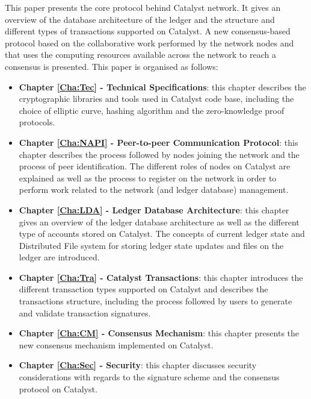 This paper presents the core protocol behind Catalyst network. It gives an overview of the database architecture of the ledger and the structure and different types of transactions supported on Catalyst. A new consensus-based protocol based on the collaborative work performed by the network nodes and that uses the computing resources available across the network to reach a consensus is presented. This paper is organised as follows:

\begin{itemize}
\item \textbf{Chapter \ref{Cha:Tec} - Technical Specifications}: this chapter describes the cryptographic libraries and tools used in Catalyst code base, including the choice of elliptic curve, hashing algorithm and the zero-knowledge proof protocols. 

\item \textbf{Chapter \ref{Cha:NAPI} - Peer-to-peer Communication Protocol}: this chapter describes the process followed by nodes joining the network and the process of peer identification. The different roles of nodes on Catalyst are explained as well as the process to register on the network in order to perform work related to the network (and ledger database) management. 

\item \textbf{Chapter \ref{Cha:LDA} - Ledger Database Architecture}: this chapter gives an overview of the ledger database architecture as well as the different type of accounts stored on Catalyst. The concepts of current ledger state and Distributed File system for storing ledger state updates and files on the ledger are introduced. 

\item \textbf{Chapter \ref{Cha:Tra} - Catalyst Transactions}: this chapter introduces the different transaction types supported on Catalyst and describes the transactions structure, including the process followed by users to generate and validate transaction signatures. 

\item \textbf{Chapter \ref{Cha:CM} - Consensus Mechanism}: this chapter presents the new consensus mechanism implemented on Catalyst. 



\item \textbf{Chapter \ref{Cha:Sec} - Security}: this chapter discusses security considerations with regards to the signature scheme and the consensus protocol on Catalyst. 

\end{itemize}